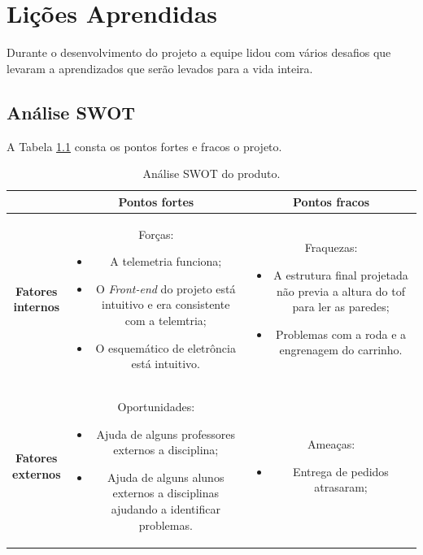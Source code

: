 \chapter{Lições Aprendidas}
\label{licoes}

Durante o desenvolvimento do projeto a equipe lidou com vários desafios que levaram a aprendizados que serão levados para a vida inteira. 

\section{Análise SWOT}

A Tabela \ref{tab:swot} consta os pontos fortes e fracos o projeto.

\begin{table}[ht]
\centering
\caption{Análise SWOT do produto.}
\begin{tabular}{|c|c|c|} \hline
 & \textbf{Pontos fortes} & \textbf{Pontos fracos}  \\ \hline 
    {\parbox{0.1\textwidth}{ \textbf{Fatores \\ internos}}}  &
    {\parbox{0.4\textwidth}{ Forças: 
        \begin{itemize}
            \item A telemetria funciona;
            \item O \textit{Front-end} do projeto está intuitivo e era consistente com a telemtria;
            \item O esquemático de eletrôncia está intuitivo.
        \end{itemize} }} & 
    {\parbox{0.4\textwidth}{ Fraquezas:
        \begin{itemize}
            \item A estrutura final projetada não previa a altura do tof para ler as paredes;
            \item Problemas com a roda e a engrenagem do carrinho.
        \end{itemize} }}\\ \hline
    {\parbox{0.1\textwidth}{ \textbf{Fatores \\ externos}}}  &
    {\parbox{0.4\textwidth}{ Oportunidades:
        \begin{itemize}
            \item Ajuda de alguns professores externos a disciplina;
            \item Ajuda de alguns alunos externos a disciplinas ajudando a identificar problemas.
        \end{itemize} }} & 
    {\parbox{0.4\textwidth}{ Ameaças:
        \begin{itemize}
            \item Entrega de pedidos atrasaram;
        \end{itemize} }}\\ \hline
\end{tabular}
\label{tab:swot}
\end{table}


